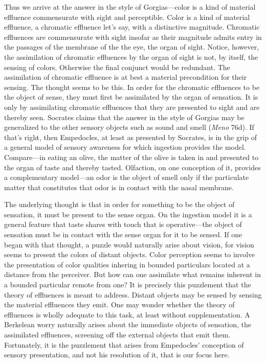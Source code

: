 \documentclass[12pt]{article}
\begin{document}
Thus we arrive at the answer in the style of Gorgias---color is a kind of material effluence commensurate with sight and perceptible. Color is a kind of material effluence, a chromatic effluence let's say, with a distinctive magnitude. Chromatic effluences are commensurate with sight insofar as their magnitude admits entry in the passages of the membrane of the the eye, the organ of sight. Notice, however, the assimilation of chromatic effluences by the organ of sight is not, by itself, the sensing of colors. Otherwise the final conjunct would be redundant. The assimilation of chromatic effluence is at best a material precondition for their sensing. The thought seems to be this. In order for the chromatic effluences to be the object of sense, they must first be assimilated by the organ of sensation. It is only by assimilating chromatic effluences that they are presented to sight and are thereby seen. Socrates claims that the answer in the style of Gorgias may be generalized to the other sensory objects such as sound and smell (\emph{Meno} 76d). If that's right, then Empedocles, at least as presented by Socrates, is in the grip of a general model of sensory awareness for which ingestion provides the model. Compare---in eating an olive, the matter of the olive is taken in and presented to the organ of taste and thereby tasted. Olfaction, on one conception of it, provides a complementary model---an odor is the object of smell only if the particulate matter that constitutes that odor is in contact with the nasal membrane. 

The underlying thought is that in order for something to be the object of sensation, it must be present to the sense organ. On the ingestion model it is a general feature that taste shares with touch that is operative---the object of sensation must be in contact with the sense organ for it to be sensed. If one began with that thought, a puzzle would naturally arise about vision, for vision seems to present the colors of distant objects. Color perception seems to involve the presentation of color qualities inhering in bounded particulars located at a distance from the perceiver. But how can one assimilate what remains inherent in a bounded particular remote from one? It is precisely this puzzlement that the theory of effluences is meant to address. Distant objects may be sensed by sensing the material effluences they emit. One may wonder whether the theory of effluences is wholly adequate to this task, at least without supplementation. A Berkelean worry naturally arises about the immediate objects of sensation, the assimilated effluences, screening off the external objects that emit them. Fortunately, it is the puzzlement that arises from Empedocles' conception of sensory presentation, and not his resolution of it, that is our focus here. 
\end{document}

